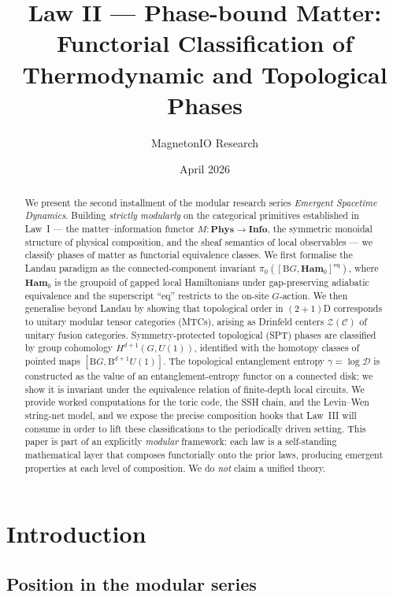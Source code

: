 \documentclass[12pt]{article}
\title{Law II --- Phase-bound Matter:\\
  Functorial Classification of Thermodynamic and Topological Phases}
\author{MagnetonIO Research}
\date{April 2026}
\theoremstyle{plain}
\theoremstyle{definition}
\theoremstyle{remark}
\newcommand{\Ham}{\mathbf{Ham}}
\newcommand{\Phys}{\mathbf{Phys}}
\newcommand{\Info}{\mathbf{Info}}
\newcommand{\BG}{\mathrm{B}G}
\begin{document}
\maketitle

\begin{abstract}
We present the second installment of the modular research series \emph{Emergent Spacetime
Dynamics}. Building \emph{strictly modularly} on the categorical primitives established
in Law~I --- the matter--information functor $M:\Phys\to\Info$, the symmetric monoidal
structure of physical composition, and the sheaf semantics of local observables --- we
classify phases of matter as functorial equivalence classes. We first formalise the
Landau paradigm as the connected-component invariant
$\pi_{0}([\BG,\Ham_{0}]^{\mathrm{eq}})$, where $\Ham_{0}$ is the groupoid of gapped local
Hamiltonians under gap-preserving adiabatic equivalence and the superscript ``eq''
restricts to the on-site $G$-action. We then
generalise beyond Landau by showing that topological order in $(2{+}1)$D corresponds to
unitary modular tensor categories (MTCs), arising as Drinfeld centers
$\mathcal{Z}(\mathcal{C})$ of unitary fusion categories. Symmetry-protected topological
(SPT) phases are classified by group cohomology $H^{d+1}(G,U(1))$, identified with the
homotopy classes of pointed maps $[\BG,\mathrm{B}^{d+1}U(1)]$. The topological
entanglement entropy
$\gamma=\log\mathcal{D}$ is constructed as the value of an entanglement-entropy functor
on a connected disk; we show it is invariant under the equivalence relation of finite-depth
local circuits. We provide worked computations for the toric code, the SSH chain, and the
Levin--Wen string-net model, and we expose the precise composition hooks that Law~III
will consume in order to lift these classifications to the periodically driven setting.
This paper is part of an explicitly \emph{modular} framework: each law is a self-standing
mathematical layer that composes functorially onto the prior laws, producing emergent
properties at each level of composition. We do \emph{not} claim a unified theory.
\end{abstract}

\tableofcontents

\section{Introduction}
\label{sec:intro}

\subsection{Position in the modular series}
\end{document}
